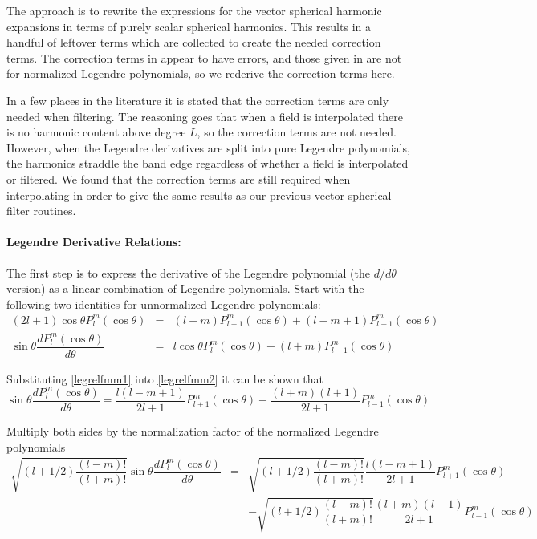 The approach is to rewrite the expressions for the vector spherical harmonic expansions in terms of purely scalar spherical harmonics. This results in a handful of leftover terms which are collected to create the needed correction terms. The correction terms in \cite{yucel2008helmholtz} appear to have errors, and those given in \cite{shanker2003fast} are not for normalized Legendre polynomials, so we rederive the correction terms here.  

In a few places in the literature it is stated that the correction terms are only needed when filtering. The reasoning goes that when a field is interpolated there is no harmonic content above degree $L$, so the correction terms are not needed. However, when the Legendre derivatives are split into pure Legendre polynomials, the harmonics straddle the band edge regardless of whether a field is interpolated or filtered. We found that the correction terms are still required when interpolating in order to give the same results as our previous vector spherical filter routines.


\paragraph{Legendre Derivative Relations:}

The first step is to express the derivative of the Legendre polynomial (the $d/d\theta$ version) as a linear combination of Legendre polynomials.  Start with the following two identities for unnormalized Legendre polynomials:
\begin{eqnarray}
(2l+1)\cos\theta P_l^m(\cos\theta) &=& (l+m)P_{l-1}^m(\cos\theta) + (l-m+1)P_{l+1}^m(\cos\theta) \label{legrelfmm1} \\
\sin\theta \dfrac{dP_l^m(\cos\theta)}{d\theta} &=& l\cos\theta P_l^m(\cos\theta) - (l+m)P_{l-1}^m(\cos\theta) \label{legrelfmm2} 
\end{eqnarray}

Substituting \eqref{legrelfmm1} into \eqref{legrelfmm2} it can be shown that
\begin{equation}
\sin\theta \dfrac{dP_l^m(\cos\theta)}{d\theta}  = \dfrac{l(l-m+1)}{2l+1}P_{l+1}^m(\cos\theta) - \dfrac{(l+m)(l+1)}{2l+1}P_{l-1}^m(\cos\theta)
\end{equation}

Multiply both sides by the normalization factor of the normalized Legendre polynomials
\begin{eqnarray}
\sqrt{(l + 1/2)\dfrac{(l-m)!}{(l+m)!}}\sin\theta \dfrac{dP_l^m(\cos\theta)}{d\theta} & =& \sqrt{(l + 1/2)\dfrac{(l-m)!}{(l+m)!}}\dfrac{l(l-m+1)}{2l+1}P_{l+1}^m(\cos\theta) \nonumber \\ 
\ & \  & - \sqrt{(l + 1/2)\dfrac{(l-m)!}{(l+m)!}}\dfrac{(l+m)(l+1)}{2l+1}P_{l-1}^m(\cos\theta) \nonumber \\
\end{eqnarray}

